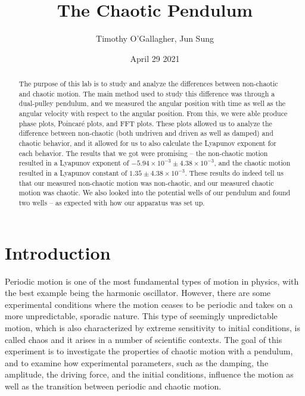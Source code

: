 \documentclass[twocolumn,amsmath,amssymb,pra, floatfix]{revtex4-2}
\begin{document}
\title{The Chaotic Pendulum}
\author{Timothy O'Gallagher, Jun Sung}
\date{April 29 2021}

\begin{abstract}
The purpose of this lab is to study and analyze the differences between non-chaotic and chaotic motion. 
The main method used to study this difference was through a dual-pulley pendulum, and we measured the 
angular position with time as well as the angular velocity with respect to the angular position.
From this, we were able produce phase plots, Poincar\'{e} plots, and FFT plots. These plots allowed us to
analyze the difference between non-chaotic (both undriven and driven as well as damped) and chaotic behavior, and it allowed for us to also calculate
the Lyapunov exponent for each behavior. The results that we got were promising -- the non-chaotic motion resulted in a Lyapunov exponent of $-5.94 \times 10^{-3} \pm 4.38 \times 10^{-3}$, and the chaotic motion resulted in a Lyapunov constant of $1.35 \pm 4.38 \times 10^{-3}$. These results do indeed tell us that our measured non-chaotic motion was non-chaotic, and our measured chaotic motion was chaotic. We also looked into the potential wells of our pendulum and found two wells -- as expected with how our apparatus was set up.

\end{abstract}

\maketitle

\section{Introduction}
Periodic motion is one of the most fundamental types of motion in physics, with the best example being the harmonic oscillator. However, there are some experimental conditions where the motion ceases to be periodic and takes on a more unpredictable, sporadic nature. This type of seemingly unpredictable motion, which is also characterized by extreme sensitivity to initial conditions, is called chaos and it arises in a number of scientific contexts. The goal of this experiment is to investigate the properties of chaotic motion with a pendulum, and to examine how experimental parameters, such as the damping, the amplitude, the driving force, and the initial conditions, influence the motion as well as the transition between periodic and chaotic motion. 
\end{document}
